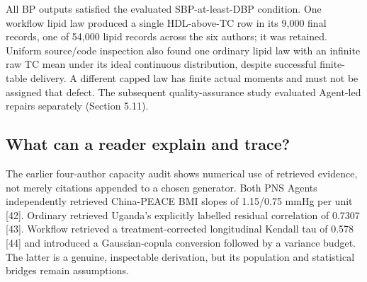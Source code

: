 \documentclass[11pt,letterpaper]{article}
\begin{document}
All BP outputs satisfied the evaluated SBP-at-least-DBP condition. One workflow lipid law produced a single HDL-above-TC row in its 9,000 final records, one of 54,000 lipid records across the six authors; it was retained. Uniform source/\allowbreak{}code inspection also found one ordinary lipid law with an infinite raw TC mean under its ideal continuous distribution, despite successful finite-table delivery. A different capped law has finite actual moments and must not be assigned that defect. The subsequent quality-assurance study evaluated Agent-led repairs separately (Section 5.11).


\subsection{What can a reader explain and trace?}

The earlier four-author capacity audit shows numerical use of retrieved evidence, not merely citations appended to a chosen generator. Both PNS Agents independently retrieved China-PEACE BMI slopes of 1.15/\allowbreak{}0.75 mmHg per unit [42]. Ordinary retrieved Uganda's explicitly labelled residual correlation of 0.7307 [43]. Workflow retrieved a treatment-corrected longitudinal Kendall tau of 0.578 [44] and introduced a Gaussian-copula conversion followed by a variance budget. The latter is a genuine, inspectable derivation, but its population and statistical bridges remain assumptions.


\FloatBarrier

\begingroup

\small

\renewcommand{\arraystretch}{1.22}
\end{document}
